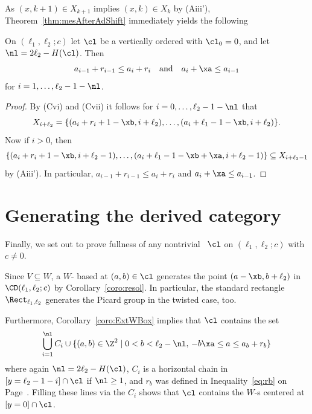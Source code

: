 {As} $(x,k+1)\in X_{k+1}$
implies $(x,k)\in X_k$ by (Aiii'), 
Theorem~\ref{thm:mesAfterAdShift}
immediately yields the following 

\begin{coro}
\label{coro:ExtWBox}
On $(\ell_1,\ell_2;c)$ let $\cl$ be a vertically ordered {\mes} 
with $\cl_0=0$, and let $\nl=2\ell_2-H(\cl)$. Then
$$
a_{i-1}+r_{i-1}\leq a_i+r_i\quad\mbox{and}\quad 
a_i+\xa\leq a_{i-1}
$$
for $i=1,\ldots,\ell_2-1-\nl$.
\end{coro}

\begin{proof}
By (Cvi) and (Cvii) it follows for $i=0,\ldots,\ell_2-1-\nl$ that
$$
X_{i+\ell_2}=\{(a_i+r_i+1-\xb,i+\ell_2),\ldots,
(a_i+\ell_1-1-\xb,i+\ell_2)\}.
$$
Now if $i>0$, then 
$$
\{(a_i+r_i+1-\xb,i+\ell_2-1),\ldots,
(a_i+\ell_1-1-\xb+\xa,i+\ell_2-1)\}\subseteq X_{i+\ell_2-1}
$$
by (Aiii'). In particular, $a_{i-1}+r_{i-1}\leq a_i+r_i$ and
$a_i+\xa\leq a_{i-1}$.
\end{proof}

\section{Generating the derived category}
\label{sec:GenDerCat}
Finally, we set out to prove fullness of any nontrivial 
{\mes}~$\cl$ on $(\ell_1,\ell_2;c)$ with $c\not=0$. 

{Since $V\subseteq W$, 
a $W$-{\wbox} based at $(a,b)\in\cl$ generates 
the point $(a-\xb,b+\ell_2)$ in $\CD(\ell_1,\ell_2;c)$
by Corollary~\ref{coro:resol}.} In particular, 
the standard rectangle $\Rect_{\ell_1,\ell_2}$ generates
the Picard group in the twisted case, too.

Furthermore, Corollary~\ref{coro:ExtWBox} implies
that $\cl$ contains the set
\begin{equation}
\label{eq:ExtWbox}
\bigcup_{i=1}^\nl C_i
\cup\{(a,b)\in\Z^2\mid0<b<\ell_2-\nl,\,
-b\xa\leq a\leq a_b+r_b\}
\end{equation}{where again $\nl=2\ell_2-H(\cl)$, $C_i$ is a horizontal 
chain in $[y=\ell_2-1-i]\cap\cl$ if $\nl\geq1$, and $r_b$ was defined in Inequality~\eqref{eq:rb} on Page~\pageref{eq:rb}.}
Filling these lines via the $C_i$ shows that $\cl$
contains the $W$-{\wbox}s centered at $[y=0]\cap\cl$.


